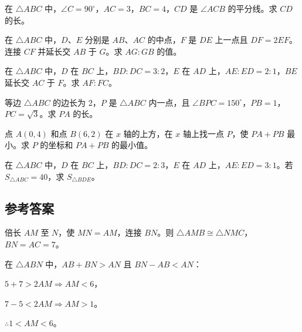 \documentclass[12pt, a4paper]{ctexart}
\begin{document}
\begin{exerbox}[【第 3 题】角平分线辅助线]
在 \(\triangle ABC\) 中，\(\angle C = 90^\circ\)，\(AC = 3\)，\(BC = 4\)，\(CD\) 是 \(\angle ACB\) 的平分线。求 \(CD\) 的长。
\end{exerbox}

\begin{exerbox}[【第 4 题】构造中位线]
在 \(\triangle ABC\) 中，\(D\)、\(E\) 分别是 \(AB\)、\(AC\) 的中点，\(F\) 是 \(DE\) 上一点且 \(DF = 2EF\)。连接 \(CF\) 并延长交 \(AB\) 于 \(G\)。求 \(AG:GB\) 的值。
\end{exerbox}

\begin{exerbox}[【第 5 题】作平行线]
在 \(\triangle ABC\) 中，\(D\) 在 \(BC\) 上，\(BD:DC = 3:2\)，\(E\) 在 \(AD\) 上，\(AE:ED = 2:1\)，\(BE\) 延长交 \(AC\) 于 \(F\)。求 \(AF:FC\)。
\end{exerbox}

\begin{exerbox}[【第 6 题】旋转法]
等边 \(\triangle ABC\) 的边长为 2，\(P\) 是 \(\triangle ABC\) 内一点，且 \(\angle BPC = 150^\circ\)，\(PB = 1\)，\(PC = \sqrt{3}\)。求 \(PA\) 的长。
\end{exerbox}

\begin{exerbox}[【第 7 题】对称/翻折法]
点 \(A(0, 4)\) 和点 \(B(6, 2)\) 在 \(x\) 轴的上方，在 \(x\) 轴上找一点 \(P\)，使 \(PA + PB\) 最小。求 \(P\) 的坐标和 \(PA + PB\) 的最小值。
\end{exerbox}

\begin{exerbox}[【第 8 题】面积法]
在 \(\triangle ABC\) 中，\(D\) 在 \(BC\) 上，\(BD:DC = 2:3\)，\(E\) 在 \(AD\) 上，\(AE:ED = 3:1\)。若 \(S_{\triangle ABC} = 40\)，求 \(S_{\triangle BDE}\)。
\end{exerbox}

\subsection*{\textcolor{tipgreen}{参考答案}}

\begin{knowledgebox}[第 1 题 参考答案]
倍长 \(AM\) 至 \(N\)，使 \(MN = AM\)，连接 \(BN\)。则 \(\triangle AMB \cong \triangle NMC\)，\(BN = AC = 7\)。

在 \(\triangle ABN\) 中，\(AB + BN > AN\) 且 \(BN - AB < AN\)：

\(5 + 7 > 2AM \Rightarrow AM < 6\)，

\(7 - 5 < 2AM \Rightarrow AM > 1\)。

\(\therefore 1 < AM < 6\)。
\end{knowledgebox}
\end{document}
